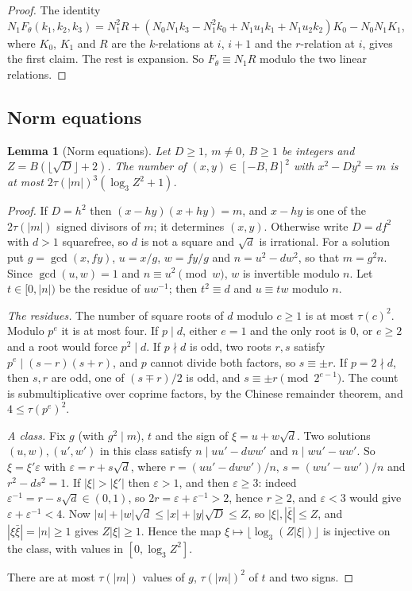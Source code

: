 \documentclass[11pt]{amsart}
\newtheorem{lemma}[theorem]{Lemma}
\theoremstyle{definition}
\theoremstyle{remark}
\begin{document}
\begin{proof}
The identity
$N_1F_\theta(k_1,k_2,k_3)=N_1^2R+(N_0N_1k_3-N_1^2k_0+N_1u_1k_1+N_1u_2k_2)K_0-N_0N_1K_1$, where $K_0$, $K_1$
and $R$ are the $k$-relations at $i$, $i+1$ and the $r$-relation at $i$, gives the first claim.
The rest is expansion. So $F_\theta\equiv N_1R$ modulo the two linear relations.
\end{proof}

\subsection{Norm equations}

\begin{lemma}[Norm equations]\label{lem:norm}
Let $D\ge1$, $m\ne0$, $B\ge1$ be integers and $Z=B(\lfloor\sqrt D\rfloor+2)$. The number of
$(x,y)\in[-B,B]^2$ with $x^2-Dy^2=m$ is at most $2\tau(|m|)^3(\log_3Z^2+1)$.
\end{lemma}

\begin{proof}
If $D=h^2$ then $(x-hy)(x+hy)=m$, and $x-hy$ is one of the $2\tau(|m|)$ signed divisors of $m$;
it determines $(x,y)$. Otherwise write $D=df^2$ with $d>1$ squarefree, so $d$ is not a square
and $\sqrt d$ is irrational. For a solution put $g=\gcd(x,fy)$, $u=x/g$, $w=fy/g$ and
$n=u^2-dw^2$, so that $m=g^2n$. Since $\gcd(u,w)=1$ and $n\equiv u^2\pmod w$, $w$ is invertible
modulo $n$. Let $t\in[0,|n|)$ be the residue of $uw^{-1}$; then $t^2\equiv d$ and $u\equiv tw$
modulo $n$.

\emph{The residues.} The number of square roots of $d$ modulo $c\ge1$ is at most $\tau(c)^2$. Modulo
$p^e$ it is at most four. If $p\mid d$, either $e=1$ and the only root is $0$, or $e\ge2$ and a
root would force $p^2\mid d$. If $p\nmid d$ is odd, two roots $r,s$ satisfy
$p^e\mid(s-r)(s+r)$, and $p$ cannot divide both factors, so $s\equiv\pm r$. If $p=2\nmid d$,
then $s,r$ are odd, one of $(s\mp r)/2$ is odd, and $s\equiv\pm r\pmod{2^{e-1}}$. The count is
submultiplicative over coprime factors, by the Chinese remainder theorem, and $4\le\tau(p^e)^2$.

\emph{A class.} Fix $g$ (with $g^2\mid m$), $t$ and the sign of $\xi=u+w\sqrt d$. Two
solutions $(u,w),(u',w')$ in this class satisfy $n\mid uu'-dww'$ and $n\mid wu'-uw'$. So
$\xi=\xi'\varepsilon$ with $\varepsilon=r+s\sqrt d$, where $r=(uu'-dww')/n$, $s=(wu'-uw')/n$ and
$r^2-ds^2=1$. If $|\xi|>|\xi'|$ then $\varepsilon>1$, and then $\varepsilon\ge3$: indeed
$\varepsilon^{-1}=r-s\sqrt d\in(0,1)$, so $2r=\varepsilon+\varepsilon^{-1}>2$, hence $r\ge2$, and
$\varepsilon<3$ would give $\varepsilon+\varepsilon^{-1}<4$. Now $|u|+|w|\sqrt d\le|x|+|y|\sqrt
D\le Z$, so $|\xi|,|\bar\xi|\le Z$, and $|\xi\bar\xi|=|n|\ge1$ gives $Z|\xi|\ge1$. Hence the map
$\xi\mapsto\lfloor\log_3(Z|\xi|)\rfloor$ is injective on the class, with values in
$[0,\log_3Z^2]$.

There are at most $\tau(|m|)$ values of $g$, $\tau(|m|)^2$ of $t$ and two signs.
\end{proof}
\end{document}
